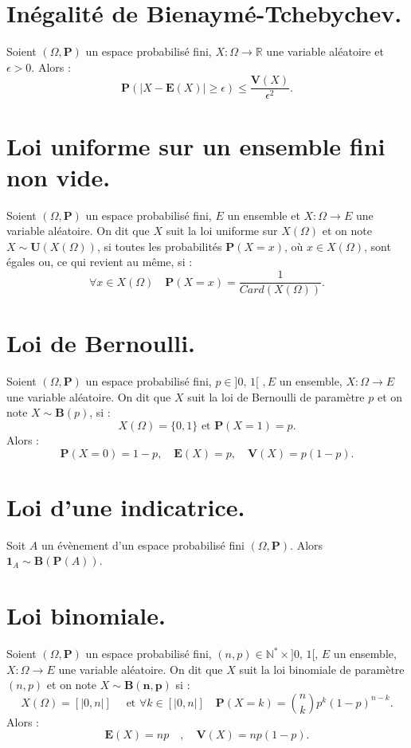 \documentclass{article}
\begin{document}
\section{Inégalité de Bienaymé-Tchebychev.}
Soient $(\Omega, \mathbf{P})$ un espace probabilisé fini, $X : \Omega \longrightarrow \mathbb{R}$ une variable aléatoire et $\epsilon > 0$. Alors : 
\[
    \mathbf{P}(|X - \mathbf{E}(X)| \geq \epsilon) \leq \dfrac{\mathbf{V}(X)}{\epsilon^2}.
\] 

\section{Loi uniforme sur un ensemble fini non vide.}
Soient $(\Omega, \mathbf{P})$ un espace probabilisé fini, $E$ un ensemble et $X : \Omega \longrightarrow E$ une variable aléatoire. On dit que $X$ suit la loi uniforme sur $X(\Omega)$ et on note $X \sim \mathbf{U}(X(\Omega))$, si toutes les probabilités $\mathbf{P}(X = x)$, où $x \in X(\Omega)$, sont égales ou, ce qui revient au même, si : 
\[  
    \forall x \in X(\Omega) \quad \mathbf{P}(X = x) = \dfrac{1}{Card(X(\Omega))}.
\]  

\section{Loi de Bernoulli.}
Soient $(\Omega, \mathbf{P})$ un espace probabilisé fini, $p \in \text{]0, 1[ }, E $ un ensemble, $X : \Omega \longrightarrow E$ une variable aléatoire. On dit que $X$ suit la loi de Bernoulli de paramètre $p$ et on note $X \sim \mathbf{B}(p)$, si : 
\[
    X(\Omega) = \{0, 1\} \text{ et }\mathbf{P}(X = 1) = p.
\]
Alors : 
\[
    \mathbf{P}(X=0) = 1-p , \quad \mathbf{E}(X) = p , \quad \mathbf{V}(X) = p(1-p).
\]

\section{Loi d'une indicatrice.}
Soit $A$ un évènement d'un espace probabilisé fini $(\Omega, \mathbf{P})$. Alors $\mathbf{1}_A \sim \mathbf{B}(\mathbf{P}(A)).$

\section{Loi binomiale.}
Soient $(\Omega, \mathbf{P})$ un espace probabilisé fini, $(n,p) \in \mathbb{N}^* \times \text{]0, 1[, } E$ un ensemble, $X : \Omega \longrightarrow E$ une variable aléatoire. On dit que $X$ suit la loi binomiale de paramètre $(n,p)$ et on note $X \sim \mathbf{B(n,p)}$ si : 
\[
    X(\Omega) = [|0, n|] \quad \text{ et } \forall k \in [|0, n|] \quad \mathbf{P}(X = k) = \binom{n}{k}p^k(1-p)^{n-k}.
\]
Alors : 
\[
    \mathbf{E}(X) = np \quad , \quad \mathbf{V}(X) = np(1-p).
\]
\end{document}
